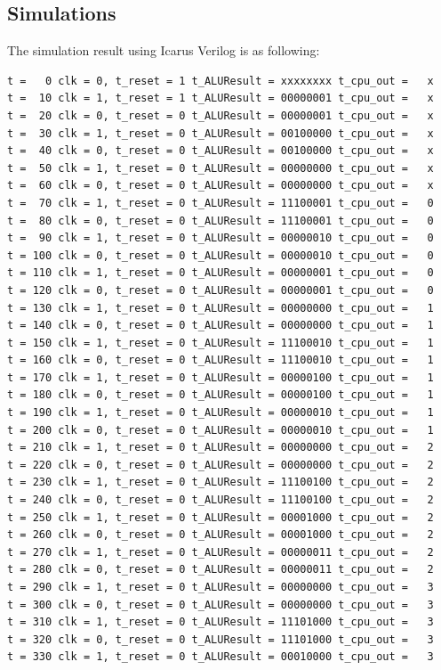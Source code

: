 \documentclass{article}
\begin{document}
\subsection{Simulations}
The simulation result using Icarus Verilog is as following:
\begin{Verbatim}[fontsize = \footnotesize]
t =   0 clk = 0, t_reset = 1 t_ALUResult = xxxxxxxx t_cpu_out =   x
t =  10 clk = 1, t_reset = 1 t_ALUResult = 00000001 t_cpu_out =   x
t =  20 clk = 0, t_reset = 0 t_ALUResult = 00000001 t_cpu_out =   x
t =  30 clk = 1, t_reset = 0 t_ALUResult = 00100000 t_cpu_out =   x
t =  40 clk = 0, t_reset = 0 t_ALUResult = 00100000 t_cpu_out =   x
t =  50 clk = 1, t_reset = 0 t_ALUResult = 00000000 t_cpu_out =   x
t =  60 clk = 0, t_reset = 0 t_ALUResult = 00000000 t_cpu_out =   x
t =  70 clk = 1, t_reset = 0 t_ALUResult = 11100001 t_cpu_out =   0
t =  80 clk = 0, t_reset = 0 t_ALUResult = 11100001 t_cpu_out =   0
t =  90 clk = 1, t_reset = 0 t_ALUResult = 00000010 t_cpu_out =   0
t = 100 clk = 0, t_reset = 0 t_ALUResult = 00000010 t_cpu_out =   0
t = 110 clk = 1, t_reset = 0 t_ALUResult = 00000001 t_cpu_out =   0
t = 120 clk = 0, t_reset = 0 t_ALUResult = 00000001 t_cpu_out =   0
t = 130 clk = 1, t_reset = 0 t_ALUResult = 00000000 t_cpu_out =   1
t = 140 clk = 0, t_reset = 0 t_ALUResult = 00000000 t_cpu_out =   1
t = 150 clk = 1, t_reset = 0 t_ALUResult = 11100010 t_cpu_out =   1
t = 160 clk = 0, t_reset = 0 t_ALUResult = 11100010 t_cpu_out =   1
t = 170 clk = 1, t_reset = 0 t_ALUResult = 00000100 t_cpu_out =   1
t = 180 clk = 0, t_reset = 0 t_ALUResult = 00000100 t_cpu_out =   1
t = 190 clk = 1, t_reset = 0 t_ALUResult = 00000010 t_cpu_out =   1
t = 200 clk = 0, t_reset = 0 t_ALUResult = 00000010 t_cpu_out =   1
t = 210 clk = 1, t_reset = 0 t_ALUResult = 00000000 t_cpu_out =   2
t = 220 clk = 0, t_reset = 0 t_ALUResult = 00000000 t_cpu_out =   2
t = 230 clk = 1, t_reset = 0 t_ALUResult = 11100100 t_cpu_out =   2
t = 240 clk = 0, t_reset = 0 t_ALUResult = 11100100 t_cpu_out =   2
t = 250 clk = 1, t_reset = 0 t_ALUResult = 00001000 t_cpu_out =   2
t = 260 clk = 0, t_reset = 0 t_ALUResult = 00001000 t_cpu_out =   2
t = 270 clk = 1, t_reset = 0 t_ALUResult = 00000011 t_cpu_out =   2
t = 280 clk = 0, t_reset = 0 t_ALUResult = 00000011 t_cpu_out =   2
t = 290 clk = 1, t_reset = 0 t_ALUResult = 00000000 t_cpu_out =   3
t = 300 clk = 0, t_reset = 0 t_ALUResult = 00000000 t_cpu_out =   3
t = 310 clk = 1, t_reset = 0 t_ALUResult = 11101000 t_cpu_out =   3
t = 320 clk = 0, t_reset = 0 t_ALUResult = 11101000 t_cpu_out =   3
t = 330 clk = 1, t_reset = 0 t_ALUResult = 00010000 t_cpu_out =   3

\end{Verbatim}
\end{document}
